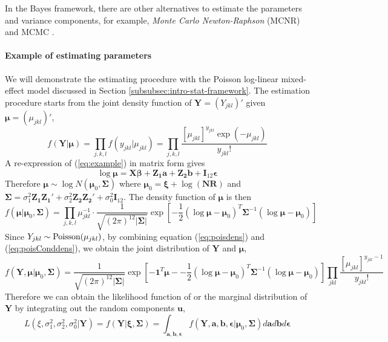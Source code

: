 In the Bayes framework, there are other alternatives to estimate the parameters and variance
components, for example,  \textit{Monte Carlo Newton-Raphson} (MCNR) \citep{mcculloch1997maximum} and  MCMC \citep{hadfield2010mcmc}.

\paragraph{Example of estimating parameters}
We will demonstrate the estimating procedure with the Poisson log-linear mixed-effect model
discussed in Section \ref{subsubsec:intro-stat-framework}.
The estimation procedure starts from the joint density function of $\bm Y=(Y_{jkl})'$ given $\bm
\mu= (\mu_{jkl})'$,
\begin{equation}\label{eq:poisdens}
	f(\bm Y|\bm \mu )=\prod_{ j,
		k,l}f(y_{jkl}|\mu_{jkl})=\prod_{j,k,l}\frac{[\mu_{jkl}]^{y_{jkl}}\exp(-\mu_{jkl})}{y_{jkl}!}
\end{equation}
A re-expression of  (\ref{eq:example}) in matrix form gives 
\[\log\bm \mu= \bm {X\beta} + \bm {Z_1 a} + \bm{Z_2b} + \bm I_{12}\bm \epsilon \]
Therefore  $\bm\mu  \sim \log N(\bm \mu_0, \bm \Sigma)$ where $\bm \mu_0 =\bm\xi + \log(\bm {NR})$
and $\bm \Sigma = \sigma_1^2\bm {Z_1Z_1'} + \sigma_2^2\bm {Z_2 Z_2'} +\sigma_0^2 \bm I_{12}$.
The density function of $\bm \mu$ is then
\begin{equation}\label{eq:poisConddens}
	f(\bm \mu |\bm \mu_0, \bm \Sigma)=\prod_{j,k,l} \mu_{jkl}^{-1}\cdot \frac{1}{
		\sqrt{(2\pi)^{12}|\bm\Sigma|}}\exp[-\frac{1}{2} {(\log\bm \mu - \bm \mu_0)^T\bm \Sigma^{-1}(\log\bm
		\mu - \bm \mu_0)}]
\end{equation}
Since $Y_{jkl}\sim \text{Poisson} (\mu_{jkl})$, by combining equation (\ref{eq:poisdens}) and
(\ref{eq:poisConddens}), we obtain the joint distribution of $\bm Y$ and $\bm \mu$,
\[f(\bm Y, \bm \mu |\bm \mu_0, \bm \Sigma) =\frac{1}{\sqrt{(2\pi)^{12}|\bm \Sigma|}}\exp[-\bm
1^T\bm \mu - -\frac{1}{2} {(\log\bm \mu - \bm \mu_0)^T\bm \Sigma^{-1}(\log\bm \mu - \bm
	\mu_0)}]\prod_{jkl}\frac{[\mu_{jkl}]^{y_{jkl}-1}}{y_{jkl}!}\]
Therefore we can obtain the likelihood function of or the marginal distribution of $\bm Y$ by
integrating out the random components $\bm u$,
\begin{equation}\label{eq:example-likelihood}
	L(\xi, \sigma_1^2, \sigma_2^2, \sigma_0^2|\bm Y)=f(\bm Y|\bm \xi, \bm \Sigma)=
	\int_{\bm{a,b,\epsilon}} f(\bm Y, \bm a, \bm b, \bm \epsilon |\bm \mu_0, \bm \Sigma)d\bm a d \bm b
	d\bm \epsilon 
\end{equation}
